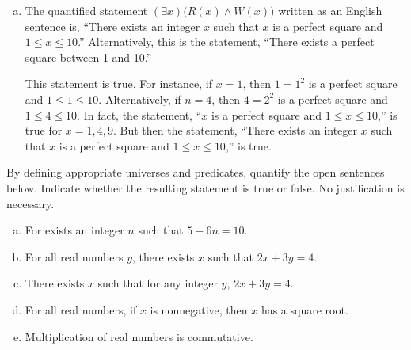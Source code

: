 \documentclass[11pt,letterpaper]{article}
\begin{document}
\begin{enumerate}[(a)]
\item The quantified statement $(\exists x) \big(R(x) \wedge W(x) \big)$ written as an English sentence is, ``There exists an integer $x$ such that $x$ is a perfect square and $1 \leq x \leq 10$.'' Alternatively, this is the statement, ``There exists a perfect square between 1 and 10.'' \pspace

This statement is true. For instance, if $x= 1$, then $1= 1^2$ is a perfect square and $1 \leq 1 \leq 10$. Alternatively, if $n= 4$, then $4= 2^2$ is a perfect square and $1 \leq 4 \leq 10$. In fact, the statement, ``$x$ is a perfect square and $1 \leq x \leq 10$,'' is true for $x= 1, 4, 9$. But then the statement, ``There exists an integer $x$ such that $x$ is a perfect square and $1 \leq x \leq 10$,'' is true. 
\end{enumerate}



\newpage



 By defining appropriate universes and predicates, quantify the open sentences below. Indicate whether the resulting statement is true or false. No justification is necessary. 
	\begin{enumerate}[(a)]
	\item For exists an integer $n$ such that $5 - 6n= 10$.
	\item For all real numbers $y$, there exists $x$ such that $2x + 3y= 4$.
	\item There exists $x$ such that for any integer $y$, $2x + 3y= 4$. 
	\item For all real numbers, if $x$ is nonnegative, then $x$ has a square root. 
	\item Multiplication of real numbers is commutative. 
	\end{enumerate} \pspace
\end{document}
